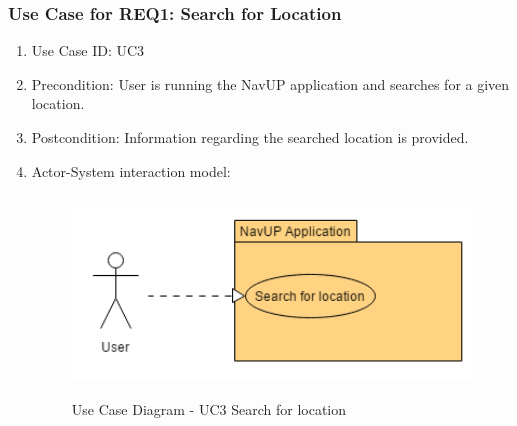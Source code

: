 \documentclass{article}
\begin{document}
		
		\newpage
		\subsubsection{Use Case for REQ1: Search for Location}
			\begin{enumerate}
			\renewcommand{\labelenumi}{{\textbf{\arabic{enumi}.}}}
			\item Use Case ID: UC3
			\item Precondition: User is running the NavUP application and searches for a given location.
			\item Postcondition: Information regarding  the searched location is provided.
			\item Actor-System interaction model:
				\graphicspath{ {./Diagrams/User/} }
				\begin{figure}[h]
				\caption{Use Case Diagram -  UC3  Search for location}
				\includegraphics[height = 200px]{SearchForLocation.png}
				\end{figure}
			\end{enumerate}
\end{document}
